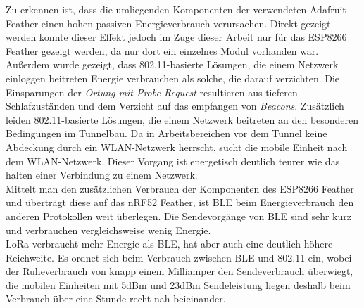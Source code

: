 Zu erkennen ist, dass die umliegenden Komponenten der verwendeten Adafruit Feather einen hohen passiven Energieverbrauch verursachen.
Direkt gezeigt werden konnte dieser Effekt jedoch im Zuge dieser Arbeit nur für das ESP8266 Feather gezeigt werden, da nur dort ein einzelnes Modul vorhanden war.\\
Außerdem wurde gezeigt, dass 802.11-basierte Lösungen, die einem Netzwerk einloggen beitreten Energie verbrauchen als solche, die darauf verzichten.
Die Einsparungen der \emph{Ortung mit Probe Request} resultieren aus tieferen Schlafzuständen und dem Verzicht auf das empfangen von \emph{Beacons}.
Zusätzlich leiden 802.11-basierte Lösungen, die einem Netzwerk beitreten an den besonderen Bedingungen im Tunnelbau.
Da in Arbeitsbereichen vor dem Tunnel keine Abdeckung durch ein WLAN-Netzwerk herrscht, sucht die mobile Einheit nach dem WLAN-Netzwerk.
Dieser Vorgang ist energetisch deutlich teurer wie das halten einer Verbindung zu einem Netzwerk.\\
Mittelt man den zusätzlichen Verbrauch der Komponenten des ESP8266 Feather und überträgt diese auf das nRF52 Feather, ist BLE beim Energieverbrauch den anderen Protokollen weit überlegen.
Die Sendevorgänge von BLE sind sehr kurz und verbrauchen vergleichsweise wenig Energie.\\
LoRa verbraucht mehr Energie als BLE, hat aber auch eine deutlich höhere Reichweite.
Es ordnet sich beim Verbrauch zwischen BLE und 802.11 ein, wobei der Ruheverbrauch von knapp einem Milliamper den Sendeverbrauch überwiegt, die mobilen Einheiten mit 5dBm und 23dBm Sendeleistung liegen deshalb beim Verbrauch über eine Stunde recht nah beieinander.

